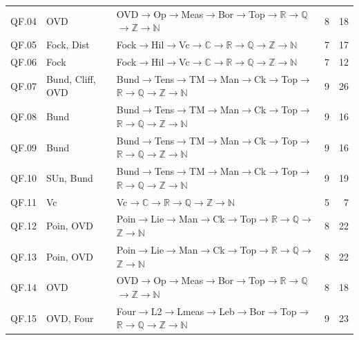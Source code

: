 {\begin{longtable}{l p{4.6cm} p{7.4cm} r r}
QF.04 & \textsf{OVD} & \textsf{OVD}$\to$\textsf{Op}$\to$\textsf{Meas}$\to$\textsf{Bor}$\to$\textsf{Top}$\to$$\mathbb R$$\to$$\mathbb Q$$\to$$\mathbb Z$$\to$$\mathbb N$ & 8 & 18 \\
QF.05 & \textsf{Fock}, \textsf{Dist} & \textsf{Fock}$\to$\textsf{Hil}$\to$\textsf{Vc}$\to$$\mathbb C$$\to$$\mathbb R$$\to$$\mathbb Q$$\to$$\mathbb Z$$\to$$\mathbb N$ & 7 & 17 \\
QF.06 & \textsf{Fock} & \textsf{Fock}$\to$\textsf{Hil}$\to$\textsf{Vc}$\to$$\mathbb C$$\to$$\mathbb R$$\to$$\mathbb Q$$\to$$\mathbb Z$$\to$$\mathbb N$ & 7 & 12 \\
QF.07 & \textsf{Bund}, \textsf{Cliff}, \textsf{OVD} & \textsf{Bund}$\to$\textsf{Tens}$\to$\textsf{TM}$\to$\textsf{Man}$\to$\textsf{Ck}$\to$\textsf{Top}$\to$$\mathbb R$$\to$$\mathbb Q$$\to$$\mathbb Z$$\to$$\mathbb N$ & 9 & 26 \\
QF.08 & \textsf{Bund} & \textsf{Bund}$\to$\textsf{Tens}$\to$\textsf{TM}$\to$\textsf{Man}$\to$\textsf{Ck}$\to$\textsf{Top}$\to$$\mathbb R$$\to$$\mathbb Q$$\to$$\mathbb Z$$\to$$\mathbb N$ & 9 & 16 \\
QF.09 & \textsf{Bund} & \textsf{Bund}$\to$\textsf{Tens}$\to$\textsf{TM}$\to$\textsf{Man}$\to$\textsf{Ck}$\to$\textsf{Top}$\to$$\mathbb R$$\to$$\mathbb Q$$\to$$\mathbb Z$$\to$$\mathbb N$ & 9 & 16 \\
QF.10 & \textsf{SUn}, \textsf{Bund} & \textsf{Bund}$\to$\textsf{Tens}$\to$\textsf{TM}$\to$\textsf{Man}$\to$\textsf{Ck}$\to$\textsf{Top}$\to$$\mathbb R$$\to$$\mathbb Q$$\to$$\mathbb Z$$\to$$\mathbb N$ & 9 & 19 \\
QF.11 & \textsf{Vc} & \textsf{Vc}$\to$$\mathbb C$$\to$$\mathbb R$$\to$$\mathbb Q$$\to$$\mathbb Z$$\to$$\mathbb N$ & 5 & 7 \\
QF.12 & \textsf{Poin}, \textsf{OVD} & \textsf{Poin}$\to$\textsf{Lie}$\to$\textsf{Man}$\to$\textsf{Ck}$\to$\textsf{Top}$\to$$\mathbb R$$\to$$\mathbb Q$$\to$$\mathbb Z$$\to$$\mathbb N$ & 8 & 22 \\
QF.13 & \textsf{Poin}, \textsf{OVD} & \textsf{Poin}$\to$\textsf{Lie}$\to$\textsf{Man}$\to$\textsf{Ck}$\to$\textsf{Top}$\to$$\mathbb R$$\to$$\mathbb Q$$\to$$\mathbb Z$$\to$$\mathbb N$ & 8 & 22 \\
QF.14 & \textsf{OVD} & \textsf{OVD}$\to$\textsf{Op}$\to$\textsf{Meas}$\to$\textsf{Bor}$\to$\textsf{Top}$\to$$\mathbb R$$\to$$\mathbb Q$$\to$$\mathbb Z$$\to$$\mathbb N$ & 8 & 18 \\
QF.15 & \textsf{OVD}, \textsf{Four} & \textsf{Four}$\to$\textsf{L2}$\to$\textsf{Lmeas}$\to$\textsf{Leb}$\to$\textsf{Bor}$\to$\textsf{Top}$\to$$\mathbb R$$\to$$\mathbb Q$$\to$$\mathbb Z$$\to$$\mathbb N$ & 9 & 23 \\

\end{longtable}}
